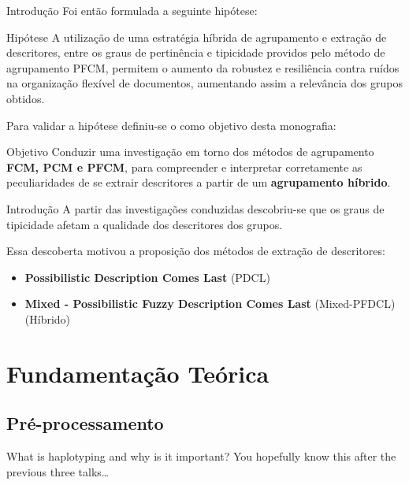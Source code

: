 \documentclass[brazil]{beamer}
\begin{document}
\begin{frame}{Introdução}
  Foi então formulada a seguinte hipótese: 
  \begin{block}{Hipótese}
    A utilização de uma estratégia \alert{híbrida} de agrupamento e extração de descritores, entre
    os graus de pertinência e tipicidade providos pelo método de agrupamento PFCM, permitem o
    aumento da robustez e resiliência contra \alert{ruídos} na \alert{organização flexível de
    documentos}, aumentando assim a relevância dos grupos obtidos.
  \end{block}

  Para validar a hipótese definiu-se o como objetivo desta monografia:

  \begin{block}{Objetivo}
    Conduzir uma investigação em torno dos métodos de agrupamento \textbf{FCM, PCM e PFCM}, para
    compreender e interpretar corretamente as peculiaridades de se extrair descritores a partir de um
    \textbf{agrupamento híbrido}.
  \end{block}
\end{frame}

\begin{frame}{Introdução}
  A partir das investigações conduzidas descobriu-se que os \alert{graus de tipicidade}
  \alert{afetam} a qualidade dos descritores dos grupos. 

  Essa descoberta motivou a proposição dos métodos de extração de descritores:

  \begin{itemize}
    \item \textbf{Possibilistic Description Comes Last} (PDCL)
    \item \textbf{Mixed - Possibilistic Fuzzy Description Comes Last} (Mixed-PFDCL) (Híbrido)
  \end{itemize} 
\end{frame}

\section{Fundamentação Teórica}

\subsection{Pré-processamento}
\begin{frame}{What is haplotyping and why is it important?}
  You hopefully know this after the previous three talks\dots
\end{frame}
\end{document}
